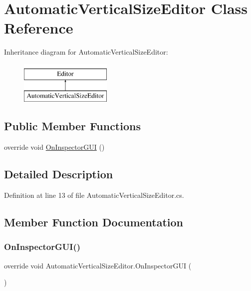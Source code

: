 \hypertarget{class_automatic_vertical_size_editor}{}\section{Automatic\+Vertical\+Size\+Editor Class Reference}
\label{class_automatic_vertical_size_editor}
Inheritance diagram for Automatic\+Vertical\+Size\+Editor\+:\begin{figure}[H]
\begin{center}
\leavevmode
\includegraphics[height=2.000000cm]{class_automatic_vertical_size_editor}
\end{center}
\end{figure}
\subsection*{Public Member Functions}
\begin{DoxyCompactItemize}
\item 
override void \hyperlink{class_automatic_vertical_size_editor_ad53fa330d671af6e7d9398ef767e9663}{On\+Inspector\+G\+UI} ()
\end{DoxyCompactItemize}


\subsection{Detailed Description}


Definition at line 13 of file Automatic\+Vertical\+Size\+Editor.\+cs.



\subsection{Member Function Documentation}
\mbox{\label{class_automatic_vertical_size_editor_ad53fa330d671af6e7d9398ef767e9663}} 
\subsubsection{\texorpdfstring{On\+Inspector\+G\+U\+I()}{OnInspectorGUI()}}
{\footnotesize\ttfamily override void Automatic\+Vertical\+Size\+Editor.\+On\+Inspector\+G\+UI (\begin{DoxyParamCaption}{ }\end{DoxyParamCaption})}



